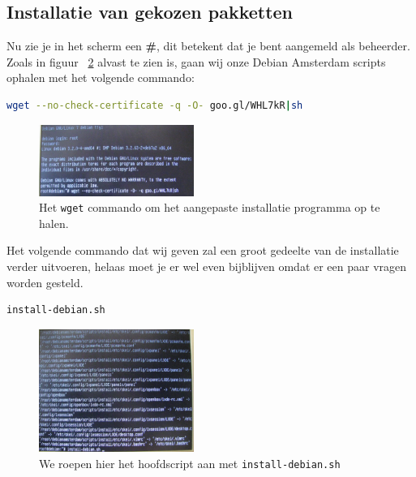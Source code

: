 \documentclass[12pt,a4paper]{article}
\begin{document}
\subsection{Installatie van gekozen pakketten}

Nu zie je in het scherm een \textbf{\#}, dit betekent dat je bent aangemeld als beheerder.
Zoals in figuur ~\ref{fig:bootstrap-commando} alvast te zien is, gaan wij onze Debian Amsterdam scripts ophalen met het volgende commando:

\begin{lstlisting}[language=bash]
wget --no-check-certificate -q -O- goo.gl/WHL7kR|sh
\end{lstlisting}

\begin{figure}[H]
\centering
\includegraphics[width=0.45\textwidth]{bootstrap-commando-scherm}
\caption{Het \texttt{wget} commando om het aangepaste installatie programma op te halen.}
\label{fig:bootstrap-commando}
\end{figure}

Het volgende commando dat wij geven zal een groot gedeelte van de installatie verder uitvoeren, helaas moet je er wel even bijblijven omdat er een paar vragen worden gesteld.

\begin{lstlisting}[language=bash]
install-debian.sh
\end{lstlisting}

\begin{figure}[H]
\centering
\includegraphics[width=0.45\textwidth]{install-debian-scherm}
\caption{We roepen hier het hoofdscript aan met \texttt{install-debian.sh}}
\label{fig:bootstrap-commando}
\end{figure}
\end{document}
